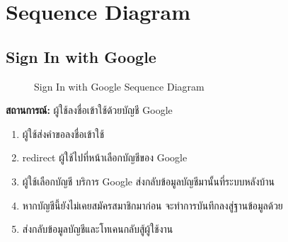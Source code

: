 \section{Sequence Diagram}
\subsection{Sign In with Google}
\begin{figure}[H]\centering
    \setlength{\fboxrule}{0.2mm} %
    \caption{Sign In with Google Sequence Diagram}\label{fig:signinSeqDiagram}
\end{figure}
\textbf{สถานการณ์: }ผู้ใช้ลงชื่อเข้าใช้ด้วยบัญชี Google
\begin{enumerate}
    \item ผู้ใช้ส่งคำขอลงชื่อเข้าใช้
    \item redirect ผู้ใช้ไปที่หน้าเลือกบัญชีของ Google
    \item ผู้ใช้เลือกบัญชี บริการ Google ส่งกลับข้อมูลบัญชีมานั้นที่ระบบหลังบ้าน
    \item หากบัญชีนี้ยังไม่เคยสมัครสมาชิกมาก่อน จะทำการบันทึกลงสู่ฐานข้อมูลด้วย
    \item ส่งกลับข้อมูลบัญชีและโทเคนกลับสู้ผู้ใช้งาน
\end{enumerate}

